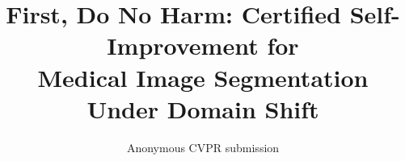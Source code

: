 \documentclass[10pt,twocolumn,letterpaper]{article}
\title{First, Do No Harm: Certified Self-Improvement for\\Medical Image Segmentation Under Domain Shift}
\author{Anonymous CVPR submission}
\begin{document}


{
    \small
    
    
}
\end{document}
